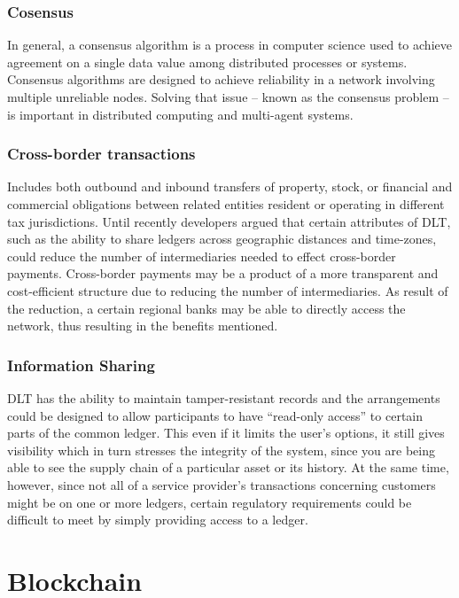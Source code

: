 \documentclass[a4paper,11pt]{report}
\begin{document}
\subsubsection{Cosensus}  
\label{consensus}

In general, a consensus algorithm is a process in computer science used to achieve agreement on a single data value among distributed processes or systems. Consensus algorithms are designed to achieve reliability in a network involving multiple unreliable nodes. Solving that issue – known as the consensus problem – is important in distributed computing and multi-agent systems.\cite{mills2016distributed}
\subsubsection{Cross-border transactions}  
\label{xborderTransactions}

Includes both outbound and inbound transfers of property, stock, or financial and commercial obligations between related entities resident or operating in different tax jurisdictions. Until recently developers argued that certain attributes of DLT, such as the ability to share ledgers across geographic distances and time-zones, could reduce the number of intermediaries needed to effect cross-border payments. Cross-border payments may be a product of a more transparent and cost-efficient structure due to reducing the number of intermediaries. As result of the reduction, a certain regional banks may be able to directly access the network, thus resulting in the benefits mentioned.\cite{mills2016distributed}


\subsubsection{Information Sharing}  
\label{infosharing}
DLT has the ability to maintain tamper-resistant records and the arrangements could be designed to allow participants to have “read-only access” to certain parts of the common ledger. This even if it limits the user’s options, it still gives visibility which in turn stresses the integrity of the system, since you are being able to see the supply chain of a particular asset or its history. At the same time, however, since not all of a service provider’s transactions concerning customers might be on one or more ledgers, certain regulatory requirements could be difficult to meet by simply providing access to a ledger.\cite{mills2016distributed}


\section{Blockchain}
\label{blockchain}
\end{document}
